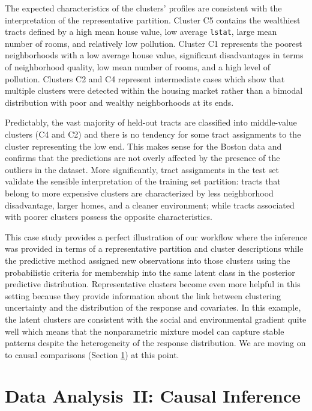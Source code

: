 \documentclass[article]{jss}\usepackage[]{graphicx}\usepackage[]{xcolor}
\DeclareRobustCommand{\code}[1]{\nolinkurl{#1}}
\begin{document}
The expected characteristics of the clusters' profiles are consistent with the interpretation of the representative partition. Cluster C5 contains the wealthiest tracts defined by a high mean house value, low average \code{lstat}, large mean number of rooms, and relatively low pollution. Cluster C1 represents the poorest neighborhoods with a low average house value, significant disadvantages in terms of neighborhood quality, low mean number of rooms, and a high level of pollution. Clusters C2 and C4 represent intermediate cases which show that multiple clusters were detected within the housing market rather than a bimodal distribution with poor and wealthy neighborhoods at its ends.

Predictably, the vast majority of held-out tracts are classified into middle-value clusters (C4 and C2) and there is no tendency for some tract assignments to the cluster representing the low end. This makes sense for the Boston data and confirms that the predictions are not overly affected by the presence of the outliers in the dataset. More significantly, tract assignments in the test set validate the sensible interpretation of the training set partition: tracts that belong to more expensive clusters are characterized by less neighborhood disadvantage, larger homes, and a cleaner environment; while tracts associated with poorer clusters possess the opposite characteristics.

This case study provides a perfect illustration of our workflow where the inference was provided in terms of a representative partition and cluster descriptions while the predictive method assigned new observations into those clusters using the probabilistic criteria for membership into the same latent class in the posterior predictive distribution. Representative clusters become even more helpful in this setting because they provide information about the link between clustering uncertainty and the distribution of the response and covariates. In this example, the latent clusters are consistent with the social and environmental gradient quite well which means that the nonparametric mixture model can capture stable patterns despite the heterogeneity of the response distribution. We are moving on to causal comparisons (Section \ref{sec:app-causal}) at this point.


\section{Data Analysis~II: Causal Inference}
\label{sec:app-causal}
\end{document}
